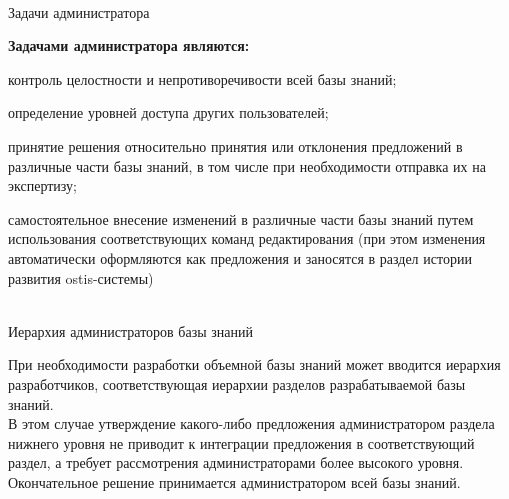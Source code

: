 \begin{frame}{\\Задачи администратора}
	\topline
	\justifying
	\begin{SCn}
		\textbf{Задачами администратора являются:}
		\begin{textitemize}
			\item контроль целостности и непротиворечивости всей базы знаний;
			\item определение уровней доступа других пользователей;
			\item принятие решения относительно принятия или отклонения предложений в различные части базы знаний, в том числе при необходимости отправка их на экспертизу;
			\item самостоятельное внесение изменений в различные части базы знаний	путем использования соответствующих команд редактирования (при этом изменения автоматически оформляются как предложения и заносятся в раздел
			истории развития ostis-системы)	
		\end{textitemize}
	\end{SCn}
\end{frame}

\begin{frame}{\\Иерархия администраторов базы знаний}
	\topline
	\justifying
	\begin{SCn}
		При необходимости разработки объемной базы знаний может вводится иерархия разработчиков, соответствующая иерархии разделов разрабатываемой базы знаний.\\ 
	    В этом случае утверждение какого-либо предложения администратором раздела нижнего уровня не приводит к интеграции предложения в соответствующий раздел, а требует рассмотрения администраторами более	высокого уровня. \\ 
	    Окончательное решение принимается администратором всей базы знаний.
	\end{SCn}
\end{frame}

